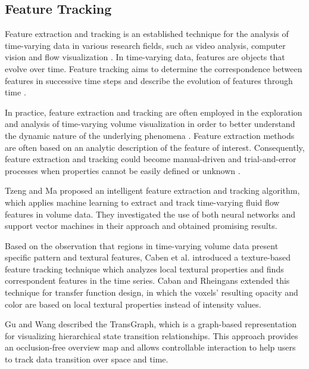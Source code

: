 \subsection{Feature Tracking}
Feature extraction and tracking is an established technique for the analysis of time-varying data in various research fields, such as video analysis, computer vision and flow visualization \cite{muelder_interactive_2009}.
In time-varying data, features are objects that evolve over time. Feature tracking aims to determine the correspondence between features in successive time steps and describe the evolution of features through time \cite{post_state_2003}.

In practice, feature extraction and tracking are often employed in the exploration and analysis of time-varying volume visualization in order to better understand the dynamic nature of the underlying phenomena \cite{wang_information_2008} \cite{woodring_multiscale_2009} \cite{lee_visualizing_2009}.
Feature extraction methods are often based on an analytic description of the feature of interest. Consequently, feature extraction and tracking could become manual-driven and trial-and-error processes when properties cannot be easily defined or unknown \cite{ma_machine_2007}.

Tzeng and Ma \cite{tzeng_intelligent_2005} proposed an intelligent feature extraction and tracking algorithm, which applies machine learning to extract and track time-varying fluid flow features in volume data.
They investigated the use of both neural networks and support vector machines in their approach and obtained promising results.

Based on the observation that regions in time-varying volume data present specific pattern and textural features, Caben et al. \cite{caban_texture-based_2007} introduced a texture-based feature tracking technique which analyzes local textural properties and finds correspondent features in the time series.
Caban and Rheingans \cite{caban_texture-based_2008} extended this technique for transfer function design, in which the voxels' resulting opacity and color are based on local textural properties instead of intensity values.

Gu and Wang \cite{gu_transgraph_2011} described the TransGraph, which is a graph-based representation for visualizing hierarchical state transition relationships. This approach provides an occlusion-free overview map and allows controllable interaction to help users to track data transition over space and time.

